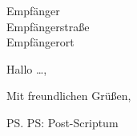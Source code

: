 \documentclass[ngerman]{scrlttr2}
\author{Autorname}
\begin{document}
	\begin{letter}{Empfänger\\Empfängerstraße\\Empfängerort}




		\opening{Hallo \dots,}

			\lipsum[1-9]

		\closing{Mit freundlichen Grüßen,}

		\ps PS: Post-Scriptum

	\end{letter}
\end{document}
